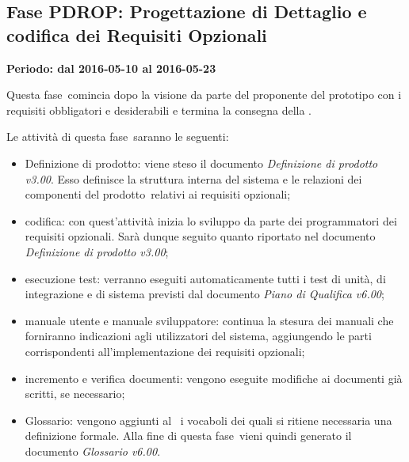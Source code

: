 \documentclass[../PianoProgetto.tex]{subfiles}
\begin{document}
	\subsection{Fase PDROP: Progettazione di Dettaglio e codifica dei Requisiti Opzionali}
		\textbf{Periodo: dal 2016-05-10 al 2016-05-23}
		
		Questa fase\g\ comincia dopo la visione da parte del proponente del prototipo con i requisiti obbligatori e desiderabili e termina la consegna della \revisionediqualifica .

		Le attività di questa fase\g\ saranno le seguenti:
		\begin{itemize}
			\item Definizione di prodotto: viene steso il documento \textit{Definizione di prodotto v3.00}. Esso definisce la struttura interna del sistema e le relazioni dei componenti del prodotto\g\ relativi ai requisiti opzionali;

			\item codifica: con quest'attività inizia lo sviluppo da parte dei programmatori dei requisiti opzionali. Sarà dunque seguito quanto riportato nel documento \textit{Definizione di prodotto v3.00};

			\item esecuzione test: verranno eseguiti automaticamente tutti i test di unità, di integrazione e di sistema previsti dal documento \textit{Piano di Qualifica v6.00};

			\item manuale utente e manuale sviluppatore: continua la stesura dei manuali che forniranno indicazioni agli utilizzatori del sistema, aggiungendo le parti corrispondenti all'implementazione dei requisiti opzionali;

			\item incremento e verifica documenti: vengono eseguite modifiche ai documenti già scritti, se necessario;
			
			\item Glossario: vengono aggiunti al \glossario\ i vocaboli dei quali si ritiene necessaria una definizione formale. Alla fine di questa fase\g\ vieni quindi generato il documento \textit{Glossario v6.00}.
		\end{itemize}
		
		
\end{document}
